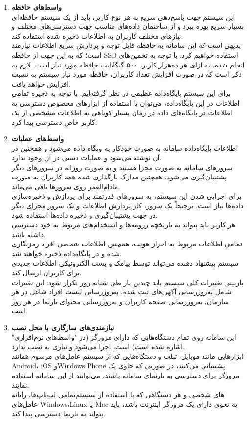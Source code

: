 \documentclass[12pt]{article}
\begin{document}
\begin{enumerate}
	\item
	\textbf{واسط‌های حافظه}\\
	این سیستم جهت پاسخ‌دهی سریع به هر نوع کاربر، باید از یک سیستم حافظه‌ای بسیار سریع بهره ببرد و از ساختمان داده‌های مناسب جهت دسترسی‌های مختلف و نیازهای مختلف کاربران به اطلاعات ذخیره شده استفاده کند.\\
	بدیهی است که این سامانه به حافظه قابل توجه و پردازش سريع اطلاعات نیازمند است؛ که به این جهت از حافظه SSD استفاده خواهیم کرد. با توجه به تخمین‌های انجام شده، به ازای هر ده‌هزار کاربر، ۵۰۰ گیگابایت حافظه مورد نیاز است. لازم به ذکر است که در صورت افزایش تعداد کاربران، حافظه‌ مورد نیاز سیستم به نسبت افزایش خواهد یافت.\\
	برای این سیستم پایگاه‌داده عظیمی در نظر گرفته‌ایم. با توجه به ذخیره تمامی اطلاعات در این پایگاه‌‌داده، می‌توان با استفاده از ابزار‌های مخصوص دسترسی به اطلاعات در پایگاه‌های داده در زمان بسیار کوتاهی به اطلاعات مشخصی از یک کاربر خاص دسترسی پیدا کرد.
	\item
	\textbf{واسط‌های عملیات}\\
	اطلاعات پایگاه‌داده سامانه به صورت خودکار به وبگاه داده می‌شود و همچنین در آن نوشته می‌شود و عملیات دستی در آن وجود ندارد.\\
	سرورهای سامانه به صورت مجزا هستند و به صورت روزانه در سرورهای دیگر پشتیبان‌گیری می‌شود، همچنین مدارک بارگذاری شده همه کاربران به صورت مادام‌العمر روی سرور‌ها باقی می‌ماند.\\
	برای اجرایی شدن این سیستم، به سرورهای قدرتمند برای پردازش و ذخیره‌سازی داده‌ها نیاز است. ترجیحاً یک سرور، کار پردازش اطلاعات و یک سرور مجزای دیگر در جهت پشتیبان‌گیری و ذخیره داده‌ها استفاده شود.\\
	هر کاربر باید بتواند به تاریخچه رزومه‌ها و استخدام‌های مربوط به خود دسترسی داشته باشد.\\
	تمامی اطلاعات مربوط به احراز هویت، همچنین اطلاعات شخصی افراد رمزنگاری شده و در پایگاه‌داده ذخیره خواهند شد.\\
	سیستم پیشنهاد دهنده می‌تواند توسط پیامک و پست الکترونیکی اطلاعات جدیدی برای کاربران ارسال کند.\\
	بازبینی تغییرات کلی سیستم باید چندین بار طی شبانه روز تکرار شود. این تغییرات شامل به‌روزرسانی آگهی‌های ثبت شده، به‌روزرسانی لیست افراد شاغل در هر سازمان، به‌روزرسانی صفحه کاربران و به‌روزرسانی محتوای تارنما در هر روز است.

	\item
	\textbf{نیازمندی‌های سازگاری با محل نصب}\\
	این سامانه روی تمام دستگاه‌هایی که دارای مرورگر (در "واسط‌های نرم‌افزاری" اشاره شده است) است، اجرا می‌شود و نیازی به نصب ندارد.\\
	ابزارهایی مانند موبایل، تبلت و دستگاه‌هایی که از سیستم عامل‌های مرسوم همانند Android، iOS وWindows Phone  پشتیبانی می‌کنند، در صورتی که حاوی یک مرورگر برای دسترسی به تارنمای سامانه باشند، می‌توانند از این سامانه استفاده نمایند.\\
	تمامی لپ‌تاپ‌ها، رایانه‎‌های شخصی و هر دستگاهی که با استفاده از سیستم عامل‌های Windows،Linux  یا Mac به نحوی دارای یک مرورگر اینترنت باشد، باید بتواند به تارنما دسترسی پیدا کند.
	\end{enumerate}
\end{document}

